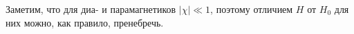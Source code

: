 Заметим, что для диа- и парамагнетиков $|\chi|\ll 1$, поэтому отличием $H$ от
$H_0$ для них можно, как правило, пренебречь.

%
%
%
%
